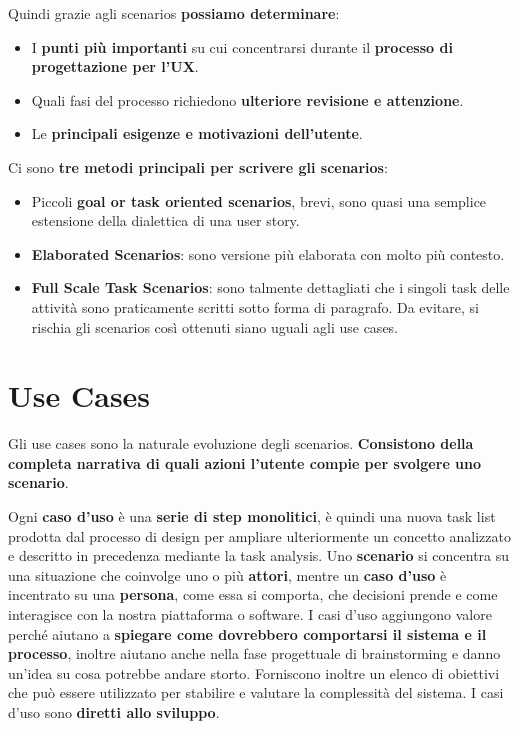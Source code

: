 \documentclass[a4paper,11pt,oneside]{book}
\begin{document}
Quindi grazie agli scenarios \textbf{possiamo determinare}:

\begin{itemize}
	\item I \textbf{punti più importanti} su cui concentrarsi durante il \textbf{processo di progettazione per l'UX}.
	\item Quali fasi del processo richiedono \textbf{ulteriore revisione e attenzione}.
	\item Le \textbf{principali esigenze e motivazioni dell'utente}.
\end{itemize}

\pagebreak

Ci sono \textbf{tre metodi principali per scrivere gli scenarios}:

\begin{itemize}
	\item Piccoli \textbf{goal or task oriented scenarios}, brevi, sono quasi una semplice estensione della dialettica di una user story.
	\item \textbf{Elaborated Scenarios}: sono versione più elaborata con molto più contesto.
	\item \textbf{Full Scale Task Scenarios}: sono talmente dettagliati che i singoli task delle attività sono praticamente scritti sotto forma di paragrafo. Da evitare, si rischia gli scenarios così ottenuti siano uguali agli use cases.
\end{itemize}

\section{Use Cases}

Gli use cases sono la naturale evoluzione degli scenarios.
\textbf{Consistono della completa narrativa di quali azioni l'utente compie per svolgere uno scenario}.

Ogni \textbf{caso d'uso} è una \textbf{serie di step monolitici}, è quindi una nuova task list prodotta dal processo di design per ampliare ulteriormente un concetto analizzato e descritto in precedenza mediante la task analysis.
Uno \textbf{scenario} si concentra su una situazione che coinvolge uno o più \textbf{attori}, mentre un
\textbf{caso d'uso} è incentrato su una \textbf{persona}, come essa si comporta, che decisioni prende e come interagisce con la nostra piattaforma o software. I casi d'uso aggiungono valore perché aiutano a \textbf{spiegare come dovrebbero comportarsi
	il sistema e il processo}, inoltre aiutano anche nella fase progettuale di brainstorming e danno un'idea su cosa potrebbe andare storto. Forniscono inoltre un elenco di obiettivi che può essere utilizzato per stabilire e valutare la complessità del sistema. I casi d'uso sono \textbf{diretti allo sviluppo}.
\end{document}

